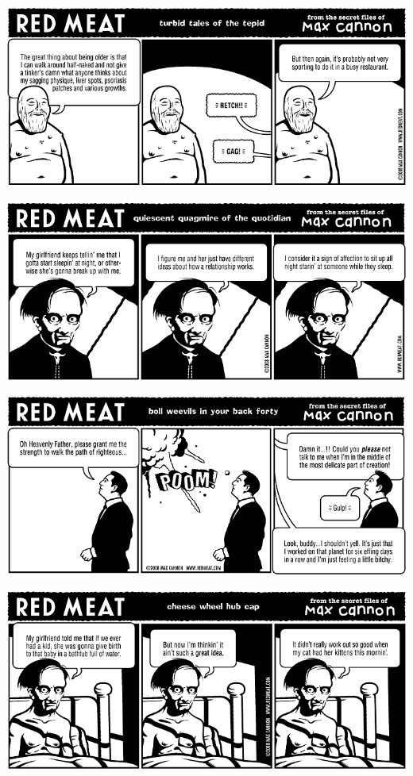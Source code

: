 \documentclass[a4paper,twoside,11pt]{article}
\begin{document}
\includegraphics[width=\textwidth]{redmeat_2008-04-08.png}



\includegraphics[width=\textwidth]{redmeat_2008-04-15.png}



\includegraphics[width=\textwidth]{redmeat_2008-04-22.png}



\includegraphics[width=\textwidth]{redmeat_2008-04-29.png}
\end{document}

